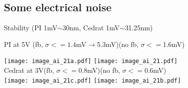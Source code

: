 \subsection{Some electrical noise}
Stability (PI 1mV$\sim$30nm, Cedrat 1mV$\sim$31.25nm)\par
PI at 5V \hspace{0.5cm}(fb, $\sigma<=1.4$mV$\rightarrow$5.3mV)\hspace{0.4cm}(no fb, $\sigma<=$1.6mV)\par
 \hspace*{2cm}\texttt{[image: image\_ai\_21a.pdf]}
 \texttt{[image: image\_ai\_21.pdf]}\\
Cedrat at 3V\hspace{0.4cm}(fb, $\sigma<=0.8$mV)\hspace{1.0cm}(no fb, $\sigma<=0.6$mV)\\
  \hspace*{2cm}\texttt{[image: image\_ai\_21c.pdf]}
 \texttt{[image: image\_ai\_21b.pdf]}\\ 
 
